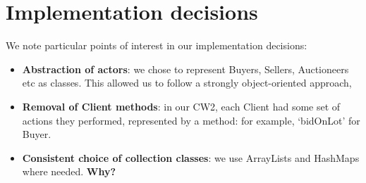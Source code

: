 \documentclass[titlepage, 12pt]{extarticle}
\begin{document}
\section{Implementation decisions}
We note particular points of interest in our implementation decisions:
\begin{itemize}
    \item {\bf Abstraction of actors}: we chose to represent Buyers, Sellers,
        Auctioneers etc as classes. This allowed us to follow a strongly
        object-oriented approach, 
    \item {\bf Removal of Client methods}: in our CW2, each Client had some set
        of actions they performed, represented by a method: for example,
        `bidOnLot' for Buyer. 
    \item {\bf Consistent choice of collection classes}: we use ArrayLists and
        HashMaps where needed. {\bf Why?}
\end{itemize}


\end{document}

